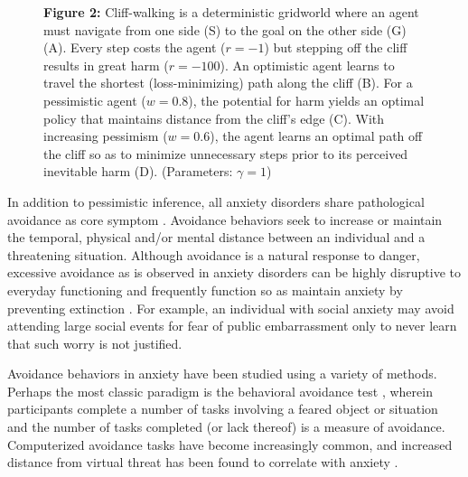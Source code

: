 \documentclass[11pt]{article} %
\begin{document}
\begin{figure}
  \centerline{%
  }
  \par \textbf{Figure 2:} Cliff-walking is a deterministic gridworld where an agent must navigate from one side (S) to the goal on the other side (G) (A). Every step costs the agent ($r=-1$) but stepping off the cliff results in great harm ($r=-100$). An optimistic agent learns to travel the shortest (loss-minimizing) path along the cliff (B). For a pessimistic agent ($w=0.8$), the potential for harm yields an optimal policy that maintains distance from the cliff's edge (C). With increasing pessimism ($w=0.6$), the agent learns an optimal path off the cliff so as to minimize unnecessary steps prior to its perceived inevitable harm (D). (Parameters: $\gamma = 1$)
\end{figure}

In addition to pessimistic inference, all anxiety disorders share pathological avoidance as core symptom \citep{dsm5, Krypotos2015, Arnaudova2017}. Avoidance behaviors seek to increase or maintain the temporal, physical and/or mental distance between an individual and a threatening situation. Although avoidance is a natural response to danger, excessive avoidance as is observed in anxiety disorders can be highly disruptive to everyday functioning \citep{Salter2004} and frequently function so as maintain anxiety by preventing extinction \citep{Arnaudova2017}. For example, an individual with social anxiety may avoid attending large social events for fear of public embarrassment only to never learn that such worry is not justified.

Avoidance behaviors in anxiety have been studied using a variety of methods. Perhaps the most classic paradigm is the behavioral avoidance test \citep{bandura1977}, wherein participants complete a number of tasks involving a feared object or situation and the number of tasks completed (or lack thereof) is a measure of avoidance. Computerized avoidance tasks have become increasingly common, and increased distance from virtual threat has been found to correlate with anxiety \citep{Bach2014, Bach2017, Sheynin2014}.
\end{document}
